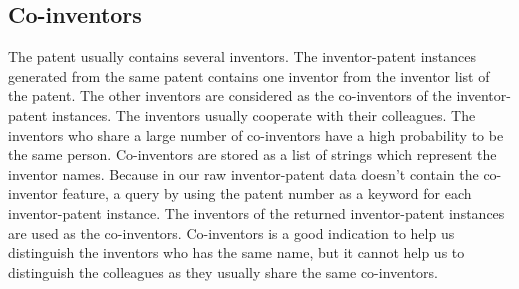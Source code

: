 \subsection{Co-inventors}
The patent usually contains several inventors. The inventor-patent instances generated from the same patent contains one inventor from the inventor list of the patent. The other inventors are considered as the co-inventors of the inventor-patent instances. The inventors usually cooperate with their colleagues. The inventors who share a large number of co-inventors have a high probability to be the same person. Co-inventors are stored as a list of strings which represent the inventor names. Because in our raw inventor-patent data doesn't contain the co-inventor feature, a query by using the patent number as a keyword for each inventor-patent instance. The inventors of the returned inventor-patent instances are used as the co-inventors. Co-inventors is a good indication to help us distinguish the inventors who has the same name, but it cannot help us to distinguish the colleagues as they usually share the same co-inventors.



